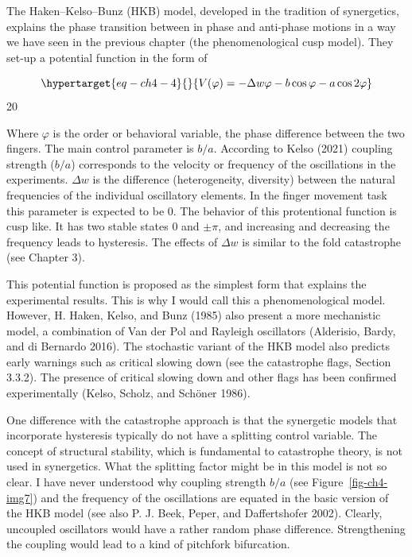 \documentclass[
  letterpaper,
]{scrbook}
\begin{document}
The Haken--Kelso--Bunz (HKB) model, developed in the tradition of
synergetics, explains the phase transition between in phase and
anti-phase motions in a way we have seen in the previous chapter (the
phenomenological cusp model). They set-up a potential function in the
form of

\begin{equation}\protect\hypertarget{eq-ch4-4}{}{
V(\varphi) = - \Delta w\varphi - b\cos\varphi - a\cos{2\varphi}}\label{eq-ch4-4}\end{equation}
20

Where \(\varphi\) is the order or behavioral variable, the phase
difference between the two fingers. The main control parameter is
\(b/a\). According to Kelso (2021) coupling strength (\(b/a\))
corresponds to the velocity or frequency of the oscillations in the
experiments. \(\Delta w\) is the difference (heterogeneity, diversity)
between the natural frequencies of the individual oscillatory elements.
In the finger movement task this parameter is expected to be 0. The
behavior of this protentional function is cusp like. It has two stable
states 0 and \(\pm \pi\), and increasing and decreasing the frequency
leads to hysteresis. The effects of \(\Delta w\) is similar to the fold
catastrophe (see Chapter 3).

This potential function is proposed as the simplest form that explains
the experimental results. This is why I would call this a
phenomenological model. However, H. Haken, Kelso, and Bunz (1985) also
present a more mechanistic model, a combination of Van der Pol and
Rayleigh oscillators (Alderisio, Bardy, and di Bernardo 2016). The
stochastic variant of the HKB model also predicts early warnings such as
critical slowing down (see the catastrophe flags, Section 3.3.2). The
presence of critical slowing down and other flags has been confirmed
experimentally (Kelso, Scholz, and Schöner 1986).

One difference with the catastrophe approach is that the synergetic
models that incorporate hysteresis typically do not have a splitting
control variable. The concept of structural stability, which is
fundamental to catastrophe theory, is not used in synergetics. What the
splitting factor might be in this model is not so clear. I have never
understood why coupling strength \(b/a\) (see Figure~\ref{fig-ch4-img7})
and the frequency of the oscillations are equated in the basic version
of the HKB model (see also P. J. Beek, Peper, and Daffertshofer 2002).
Clearly, uncoupled oscillators would have a rather random phase
difference. Strengthening the coupling would lead to a kind of pitchfork
bifurcation.
\end{document}
